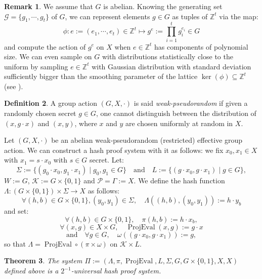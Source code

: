 \documentclass[a4paper,10pt,notitlepage]{report}
\theoremstyle{definition}
\newtheorem{Definition}{Definition}[chapter]
\theoremstyle{plain}
\newtheorem{Theorem}[Definition]{Theorem}
\theoremstyle{definition}
\newtheorem{Remark}[Definition]{Remark}
\newcommand{\Z}{\mathbb{Z}}
\newcommand{\m}[1]{\mathcal{#1}}
\renewcommand{\(}{\left(}
\renewcommand{\)}{\right)}
\DeclareMathOperator{\ProjEval}{ProjEval}
\begin{document}
\begin{Remark}\label{Remark 3}
We assume that $G$ is abelian. Knowing the generating set $\m{G}=\{g_1,\cdots, g_t\}$ of $G$,  we can represent elements $g\in G$ as tuples of $\Z^t$ via the map:
\[\phi : e:=(e_1,\cdots, e_t)\in\Z^t\longmapsto g^e:=\prod_{i=1}^t g_i^{e_i}\in G\]
and compute the action of $g^e$ on $X$ when $e\in\Z^t$ has components of polynomial size. We can even sample on $G$ with distributions statistically close to the uniform by sampling $e\in \Z^t$ with Gaussian distribution with standard deviation sufficiently bigger than the smoothing parameter of the lattice $\ker(\phi)\subseteq \Z^t$ (see \cite[Sections 3 and 4]{MaccianoRegev}). 
\end{Remark}

\begin{Definition}
A group action $(G,X,\cdot)$ is said \emph{weak-pseudorandom} if given a randomly chosen secret $g\in G$, one cannot distinguish between the distribution of $(x,g\cdot x)$ and $(x, y)$, where $x$ and $y$ are chosen uniformly at random in $X$.
\end{Definition}

Let $(G,X,\cdot)$ be an abelian weak-pseudorandom  (restricted) effective group action. We can construct a hash proof system with it as follows: we fix $x_0, x_1\in X$ with $x_1=s\cdot x_0$ with $s\in G$ secret. Let: 
\[\Sigma:=\{(g_0\cdot x_0,g_1\cdot x_1)\mid g_0, g_1\in G\}\quad \mbox{and} \quad L:=\{(g\cdot x_0,g\cdot x_1)\mid g\in G\},\]
$W:=G$, $\m{K}:=G\times\{0,1\}$ and $\m{P}=\Gamma:=X$.  We define the hash function $\Lambda : (G\times\{0,1\})\times\Sigma\longrightarrow X$ as follows:
\[\forall (h, b)\in G\times\{0,1\}, (y_0,y_1)\in \Sigma, \quad \Lambda((h,b),(y_0,y_1)):=h\cdot y_b\]
and set:
\[\forall (h, b)\in G\times\{0,1\}, \quad \pi(h,b):=h\cdot x_b,\]
\[\forall (x,g)\in X\times G, \quad \ProjEval(x,g):=g\cdot x\]
\[\mbox{and} \quad \forall g\in G, \quad \omega((g\cdot x_0,g\cdot x_1)):=g,\]
so that $\Lambda=\ProjEval\circ(\pi\times \omega)$ on $\m{K}\times L$.

\begin{Theorem}\cite[Theorem 1]{DeFeo1}\label{Theorem 5}
The system $\Pi:=(\Lambda,\pi,\ProjEval,L,\Sigma,G,G\times\{0,1\},X,X)$ defined above is a $2^{-1}$-universal hash proof system.
\end{Theorem}
\end{document}
